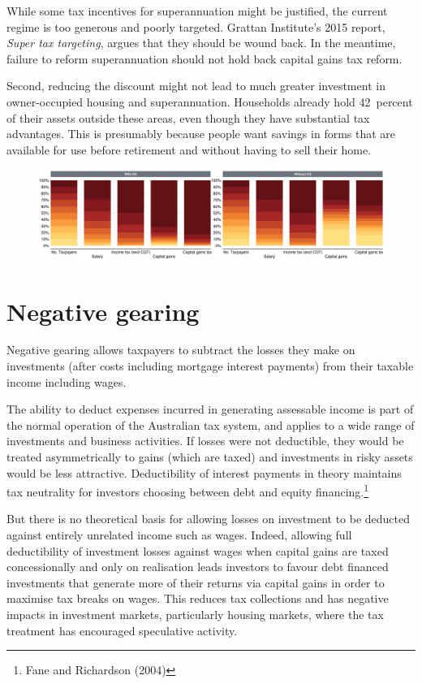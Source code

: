\documentclass{grattan}\usepackage[]{graphicx}\usepackage[]{color}
\begin{document}
While some tax incentives for superannuation might be justified, the current regime is too generous and poorly targeted. Grattan Institute's 2015 report, \textit{Super tax targeting}, argues that they should be wound back.  In the meantime, failure to reform superannuation should not hold back capital gains tax reform. 



Second, reducing the discount might not lead to much greater investment in owner-occupied housing and superannuation. Households already hold 42~percent of their assets outside these areas, even though they have substantial tax advantages. This is presumably because people want savings in forms that are available for use before retirement and without having to sell their home.  





\begin{figure}
\includegraphics[width = \textwidth]{CGT-NG-atlas//stacked-column-chart-1}
\the\textwidth
\end{figure}

\chapter{Negative gearing}
Negative gearing allows taxpayers to subtract the losses they make on
investments (after costs including mortgage interest payments) from
their taxable income including wages.

The ability to deduct expenses incurred in generating assessable income
is part of the normal operation of the Australian tax system, and
applies to a wide range of investments and business activities. If
losses were not deductible, they would be treated asymmetrically to
gains (which are taxed) and investments in risky assets would be less
attractive. Deductibility of interest payments in theory maintains tax
neutrality for investors choosing between debt and equity
financing.\footnote{Fane and Richardson (2004)}

But there is no theoretical basis for allowing losses on investment to
be deducted against entirely unrelated income such as wages. Indeed,
allowing full deductibility of investment losses against wages when
capital gains are taxed concessionally and only on realisation leads
investors to favour debt financed investments that generate more of
their returns via capital gains in order to maximise tax breaks on
wages. This reduces tax collections and has negative impacts in
investment markets, particularly housing markets, where the tax
treatment has encouraged speculative activity.
\end{document}
